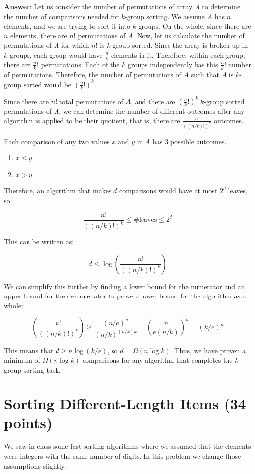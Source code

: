 \documentclass[11pt]{article}
\begin{document}
\bigbreak

\textbf{Answer}: 
Let us consider the number of permutations of array $A$ to determine the number of comparisons needed for $k$-group sorting. 
We assume $A$ has $n$ elements, and we are trying to sort it into $k$ groups. 
On the whole, since there are $n$ elements, there are $n!$ permutations of $A$. 
Now, let us calculate the number of permutations of $A$ for which $n!$ is $k$-group sorted. 
Since the array is broken up in $k$ groups, each group would have $\frac{n}{k}$ elements in it. 
Therefore, within each group, there are $\frac{n}{k}!$ permutations. 
Each of the $k$ groups independently has this $\frac{n}{k}!$ number of permutations. 
Therefore, the number of permutations of $A$ such that $A$ is $k$-group sorted would be $(\frac{n}{k}!)^k$.

Since there are $n!$ total permutations of $A$, and there are $(\frac{n}{k}!)^k$ $k$-group sorted permutations of $A$, 
we can detemine the number of different outcomes after any algorithm is applied to be their quotient, that is, there are
$\frac{n!}{((n/k)!)^k}$ outcomes. 

Each comparison of any two values $x$ and $y$ in $A$ has $3$ possible outcomes.

\begin{enumerate}[label=(\arabic*), noitemsep]
    \item $x \leq y$
    \item $x > y$
\end{enumerate}

Therefore, an algorithm that makes $d$ comparisons would have at most $2^d$ leaves, so 

$$\frac{n!}{((n/k)!)^k} \leq \#\text{leaves} \leq 2^d$$

This can be written as:

$$d \leq \log (\frac{n!}{((n/k)!)^k})$$

We can simplify this further by finding a lower bound for the numerator and an upper bound for the demonenator to prove a lower bound 
for the algorithm as a whole: 

$$(\frac{n!}{((n/k)!)^k}) \geq \frac{(n/e)^n}{(n/k)^{(n/k)k}}=(\frac{n}{e(n/k)})^n=(k/e)^n$$

This means that $d \geq n \log(k/e)$, so $d = \Omega(n \log k)$. 
Thus, we have proven a minimum of $\Omega(n \log k)$ comparisons for any algorithm that completes the $k$-group sorting task. 

\section{Sorting Different-Length Items (34 points)}
We saw in class some fast sorting algorithms where we assumed that the elements were integers with the same number of digits. 
In this problem we change those assumptions slightly.
\end{document}
